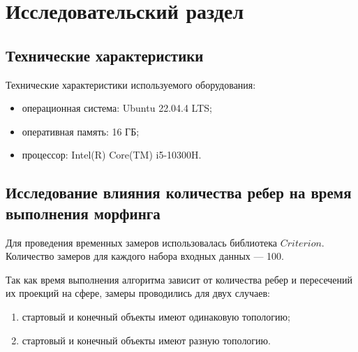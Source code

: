 \chapter{Исследовательский раздел}

\section{Технические характеристики}

Технические характеристики используемого оборудования:

\begin{itemize}[label=---]
	\item операционная система: Ubuntu 22.04.4 LTS;
	\item оперативная память: 16 ГБ;
	\item процессор: Intel(R) Core(TM) i5-10300H.
\end{itemize}

\section{Исследование влияния количества ребер на время выполнения морфинга}

Для проведения временных замеров использовалась библиотека $Criterion$. Количество замеров для каждого набора входных данных --- 100.

Так как время выполнения алгоритма зависит от количества ребер и пересечений их проекций на сфере, замеры проводились для двух случаев:
\begin{enumerate}[label={\arabic*)}]
	\item стартовый и конечный объекты имеют одинаковую топологию;
	\item стартовый и конечный объекты имеют разную топологию.
\end{enumerate}

